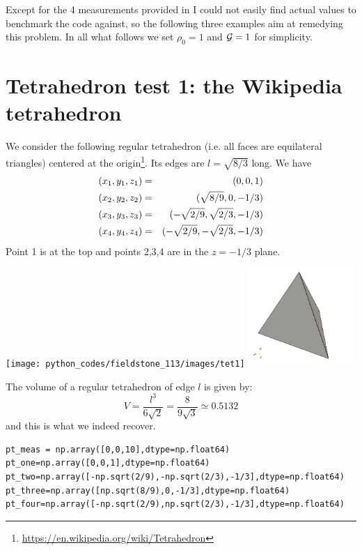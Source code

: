 Except for the 4 measurements provided in \textcite{mequ86} I could not easily find 
actual values to benchmark the code against, so the following three examples aim at 
remedying this problem. 
In all what follows we set $\rho_0=1$ and ${\cal G}=1$ for simplicity.

\section*{Tetrahedron test 1: the Wikipedia tetrahedron}

We consider the following regular tetrahedron (i.e. all faces are equilateral triangles) centered at the 
origin\footnote{\url{https://en.wikipedia.org/wiki/Tetrahedron}}. Its edges are $l=\sqrt{8/3}$ long.
We have
\begin{eqnarray}
(x_1,y_1,z_1) &=& (0,0,1) \nonumber\\
(x_2,y_2,z_2) &=& (\sqrt{8/9},0,-1/3) \nonumber\\
(x_3,y_3,z_3) &=& (-\sqrt{2/9},\sqrt{2/3},-1/3) \nonumber\\
(x_4,y_4,z_4) &=& (-\sqrt{2/9},-\sqrt{2/3},-1/3) \nonumber
\end{eqnarray}
Point 1 is at the top and points 2,3,4 are in the $z=-1/3$ plane.

\begin{center}
\texttt{[image: python\_codes/fieldstone\_113/images/tet1]}
\includegraphics[width=4cm]{python_codes/fieldstone_113/results/test1/tet}
\end{center}

The volume of a regular tetrahedron of edge $l$ is given by:
\[
V=\frac{l^3}{6\sqrt{2}} = \frac{8}{9\sqrt{3}} \simeq 0.5132
\]
and this is what we indeed recover.

\begin{lstlisting}
pt_meas = np.array([0,0,10],dtype=np.float64)
pt_one=np.array([0,0,1],dtype=np.float64)
pt_two=np.array([-np.sqrt(2/9),-np.sqrt(2/3),-1/3],dtype=np.float64)
pt_three=np.array([np.sqrt(8/9),0,-1/3],dtype=np.float64)
pt_four=np.array([-np.sqrt(2/9),np.sqrt(2/3),-1/3],dtype=np.float64)
\end{lstlisting}

